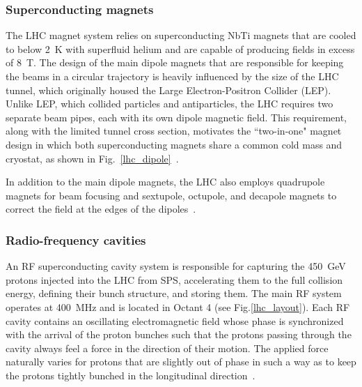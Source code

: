 

\subsubsection{Superconducting magnets}
The LHC magnet system relies on superconducting NbTi magnets that are cooled to below \SI{2}{\K} with superfluid helium and are capable of producing fields in excess of \SI{8}{\tesla}. The design of the main dipole magnets that are responsible for keeping the beams in a circular trajectory is heavily influenced by the size of the LHC tunnel, which originally housed the Large Electron-Positron Collider (LEP). Unlike LEP, which collided particles and antiparticles, the LHC requires two separate beam pipes, each with its own dipole magnetic field. This requirement, along with the limited tunnel cross section, motivates the ``two-in-one" magnet design in which both superconducting magnets share a common cold mass and cryostat, as shown in Fig.~\ref{lhc_dipole}~\cite{lhc_machine}.

In addition to the main dipole magnets, the LHC also employs quadrupole magnets for beam focusing and sextupole, octupole, and decapole magnets to correct the field at the edges of the dipoles~\cite{lhc_machine}.



\subsubsection{Radio-frequency cavities}
An RF superconducting cavity system is responsible for capturing the \SI{450}{\GeV} protons injected into the LHC from SPS, accelerating them to the full collision energy, defining their bunch structure, and storing them. The main RF system operates at \SI{400}{\MHz} and is located in Octant 4 (see Fig.\ref{lhc_layout}). Each RF cavity contains an oscillating electromagnetic field whose phase is synchronized with the arrival of the proton bunches such that the protons passing through the cavity always feel a force in the direction of their motion. The applied force naturally varies for protons that are slightly out of phase in such a way as to keep the protons tightly bunched in the longitudinal direction~\cite{lhc_machine}.

\pagebreak
